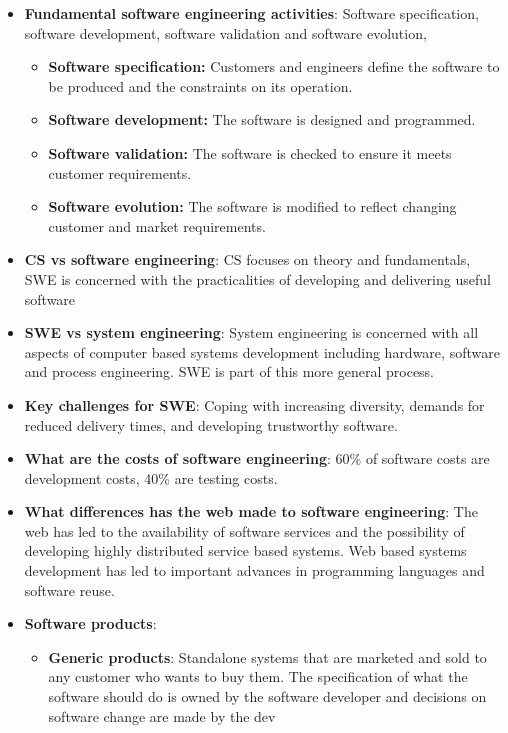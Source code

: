 \documentclass{report}
\begin{document}
\begin{itemize}
        \item \textbf{Fundamental software engineering activities}: Software specification, software development, software validation and software evolution,
            \begin{itemize}
                \item \textbf{Software specification:} Customers and engineers define the software to be produced and the constraints on its operation.
                \item \textbf{Software development:} The software is designed and programmed.
                \item \textbf{Software validation:} The software is checked to ensure it meets customer requirements.
                \item \textbf{Software evolution:} The software is modified to reflect changing customer and market requirements.
            \end{itemize}
        \item \textbf{CS vs software engineering}: CS focuses on theory and fundamentals, SWE is concerned with the practicalities of developing and delivering useful software
        \item \textbf{SWE vs system engineering}: System engineering is concerned with all aspects of computer based systems development  including hardware, software and process engineering. SWE is part of this more general process.
        \item \textbf{Key challenges for SWE}: Coping with increasing diversity, demands for reduced delivery times, and developing trustworthy software.
        \item \textbf{What are the costs of software engineering}: 60\% of software costs are development  costs, 40\% are testing costs.
        \item \textbf{What differences has the web made to software engineering}: The web has led to the availability of software services and the possibility of developing highly distributed service based systems. Web based systems development has  led to important advances in programming languages and software reuse.
        \item \textbf{Software products}:
            \begin{itemize}
                \item \textbf{Generic products}: Standalone systems that are marketed and sold to any customer who wants to buy them.
                    \bigbreak \noindent 
                    The specification of what the software should do is owned by the software developer and decisions on software change are made by the dev

\end{itemize}
\end{itemize}
\end{document}
